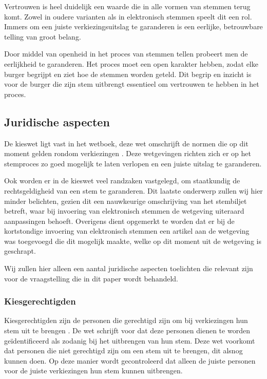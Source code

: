 \documentclass[a4paper]{article}
\begin{document}
Vertrouwen is heel duidelijk een waarde die in alle vormen van stemmen terug komt.
Zowel in oudere varianten als in elektronisch stemmen speelt dit een rol.
Immers om een juiste verkiezingsuitslag te garanderen is een eerlijke, betrouwbare telling van groot belang.

Door middel van openheid in het proces van stemmen tellen probeert men de eerlijkheid te garanderen.
Het proces moet een open karakter hebben, zodat elke burger begrijpt en ziet hoe de stemmen worden geteld.
Dit begrip en inzicht is voor de burger die zijn stem uitbrengt essentieel om vertrouwen te hebben in het proces.

\subsection{Juridische aspecten}
\label{text:juridisch}
De kieswet ligt vast in het wetboek, deze wet omschrijft de normen die op dit moment gelden rondom verkiezingen \cite{wetboek}.
Deze wetgevingen richten zich er op het stemproces zo goed mogelijk te laten verlopen en een juiste uitslag te garanderen.

Ook worden er in de kieswet veel randzaken vastgelegd, om staatkundig de rechtsgeldigheid van een stem te garanderen.
Dit laatste onderwerp zullen wij hier minder belichten, gezien dit een nauwkeurige omschrijving van het stembiljet betreft, waar bij invoering van elektronisch stemmen de wetgeving uiteraard aanpassingen behoeft.
Overigens dient opgemerkt te worden dat er bij de kortstondige invoering van elektronisch stemmen een artikel aan de wetgeving was toegevoegd die dit mogelijk maakte, welke op dit moment uit de wetgeving is geschrapt.

Wij zullen hier alleen een aantal juridische aspecten toelichten die relevant zijn voor de vraagstelling die in dit paper wordt behandeld.

\subsubsection{Kiesgerechtigden}
Kiesgerechtigden zijn de personen die gerechtigd zijn om bij verkiezingen hun stem uit te brengen \cite{jacobs2009electronic}.
De wet schrijft voor dat deze personen dienen te worden ge\"identificeerd als zodanig bij het uitbrengen van hun stem.
Deze wet voorkomt dat personen die niet gerechtigd zijn om een stem uit te brengen, dit alsnog kunnen doen.
Op deze manier wordt gecontroleerd dat alleen de juiste personen voor de juiste verkiezingen hun stem kunnen uitbrengen.
\end{document}
